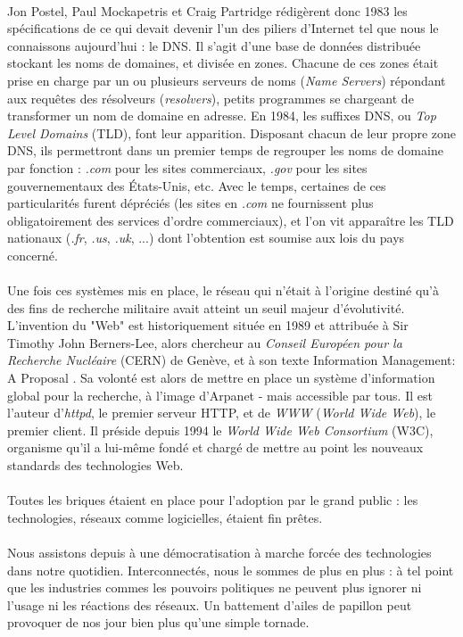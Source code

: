 \paragraph{} Jon Postel, Paul Mockapetris et Craig Partridge rédigèrent donc 1983 les spécifications de ce qui devait 
devenir l'un des piliers d'Internet tel que nous le connaissons aujourd'hui : le DNS. Il s'agit d'une base de données
distribuée stockant les noms de domaines, et divisée en zones. Chacune de ces zones était prise en charge par un ou plusieurs
serveurs de noms (\emph{Name Servers}) répondant aux requêtes des résolveurs (\emph{resolvers}), petits programmes se
chargeant de transformer un nom de domaine en adresse. En 1984, les suffixes DNS, ou \emph{Top Level Domains} (TLD),
font leur apparition. Disposant chacun de leur propre zone DNS, ils permettront dans un premier temps de regrouper les
noms de domaine par fonction : \emph{.com} pour les sites commerciaux, \emph{.gov} pour les sites gouvernementaux des
États-Unis, etc. Avec le temps, certaines de ces particularités furent dépréciés (les sites en \emph{.com}
ne fournissent plus obligatoirement des services d'ordre commerciaux), et l'on vit apparaître les TLD nationaux (\emph{.fr},
\emph{.us}, \emph{.uk}, ...) dont l'obtention est soumise aux lois du pays concerné.

\paragraph{} Une fois ces systèmes mis en place, le réseau qui n'était à l'origine destiné qu'à des fins de recherche
militaire avait atteint un seuil majeur d'évolutivité. L'invention du "Web" est historiquement située en 1989 et
attribuée à Sir Timothy John Berners-Lee, alors chercheur au \emph{Conseil Européen pour la Recherche Nucléaire} (CERN)
de Genève, et à son texte \guillemotleft Information Management: A Proposal \guillemotright \cite{Internet1}. Sa volonté
est alors de mettre en place un système d'information global pour la recherche, à l'image d'Arpanet - mais accessible par tous.
Il est l'auteur d'\emph{httpd}, le premier serveur HTTP, et de \emph{WWW} (\emph{World Wide Web}), le premier client.
Il préside depuis 1994 le \emph{World Wide Web Consortium} (W3C), organisme qu'il a lui-même fondé et chargé de mettre
au point les nouveaux standards des technologies Web.

\paragraph{} Toutes les briques étaient en place pour l'adoption par le grand public : les technologies, réseaux comme
logicielles, étaient fin prêtes.

\paragraph{} Nous assistons depuis à une démocratisation à marche forcée des technologies dans notre quotidien. 
Interconnectés, nous le sommes de plus en plus : à tel point que les industries commes les pouvoirs politiques ne
peuvent plus ignorer ni l'usage ni les réactions des réseaux. Un battement d'ailes de papillon peut provoquer de nos
jour bien plus qu'une simple tornade.
